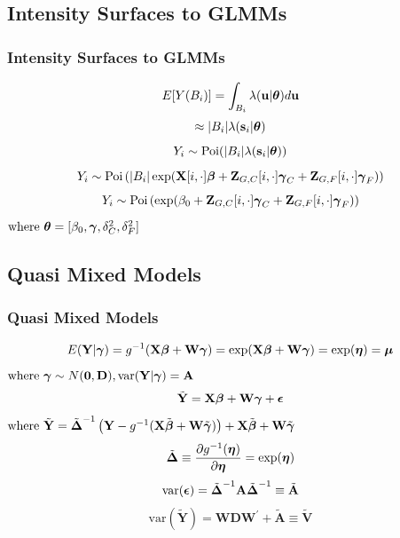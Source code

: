 \documentclass[mathserif,compress]{beamer}
\def\bdm{\begin{displaymath}}
\def\edm{\end{displaymath}}
\def\bs{\mathbf{s}}
\def\bu{\mathbf{u}}
\def\bA{\mathbf{A}}
\def\bD{\mathbf{D}}
\def\bV{\mathbf{V}}
\def\bW{\mathbf{W}}
\def\bX{\mathbf{X}}
\def\bY{\mathbf{Y}}
\def\bZ{\mathbf{Z}}
\def\bbeta{\mbox{\boldmath $\beta$}}
\def\bepsilon{\mbox{\boldmath $\epsilon$}}
\def\bgamma{\mbox{\boldmath $\gamma$}}
\def\bldeta{\mbox{\boldmath $\eta$}}
\def\bmu{\mbox{\boldmath $\mu$}}
\def\btheta{\mbox{\boldmath $\theta$}}
\def\bDelta{\mbox{\boldmath $\Delta$}}
\def\var{\textrm{var}}
\def\bzero{\mathbf{0}}
\def\Poi{\textrm{Poi}}
\begin{document}

\subsection{Intensity Surfaces to GLMMs}
\begin{frame}
\frametitle{Intensity Surfaces to GLMMs}

	\bdm
		E[Y(B_i)] = \int_{B_i} \lambda(\bu|\btheta) d\bu
	\edm \pause
	\bdm
		\approx |B_i| \lambda(\bs_i|\btheta)
	\edm \pause
	\bdm
		Y_i \sim \Poi(|B_i| \lambda(\bs_i|\btheta))
	\edm \pause
	\bdm
		Y_i \sim \Poi\left( |B_i| \exp(\bX[i,\cdot]\bbeta + 
			\bZ_{G,C}[i,\cdot]\bgamma_C + \bZ_{G,F}[i,\cdot]\bgamma_F)\right)
	\edm \pause
	\bdm
		Y_i \sim \Poi\left(\exp(\beta_0 + 
			\bZ_{G,C}[i,\cdot]\bgamma_C + \bZ_{G,F}[i,\cdot]\bgamma_F)\right)
	\edm
	$\textrm{where } \btheta = [\beta_0, \bgamma, \delta_C^2, \delta_F^2]$

\end{frame}


\subsection{Quasi Mixed Models}
\begin{frame}
\frametitle{Quasi Mixed Models}
	\vspace{-.5cm}
	\bdm
		E(\bY|\bgamma) = g^{-1}(\bX\bbeta + \bW\bgamma) = 
		\exp(\bX\bbeta + \bW\bgamma) = \exp(\bldeta) = \bmu
	\edm 
	$\textrm{where } \bgamma \sim N(\bzero, \bD), 
		\var(\bY|\mbox{\boldmath $\gamma$}) = \bA$ \pause
	\bdm
		\tilde{\bY} = \bX\bbeta + \bW\bgamma + \bepsilon
	\edm \pause
	$\textrm{where }\tilde{\bY} = \tilde{\bDelta}^{-1}\left(\bY - 
	  g^{-1}(\bX\tilde{\bbeta} + \bW\tilde{\bgamma})\right) + 
	  \bX\tilde{\bbeta} + \bW\tilde{\bgamma}$
	\bdm
   \tilde{\bDelta} \equiv  
     \frac{\partial g^{-1}(\bldeta)} 
     {\partial \bldeta} = \exp(\bldeta)
	\edm \pause
	\bdm
   \textrm{var}(\bepsilon) =   
     \tilde{\bDelta}^{-1}\bA\tilde{\bDelta}^{-1} \equiv \tilde{\bA}	
	\edm \pause
	\bdm
		\var(\tilde{\bY}) =  \bW\bD\bW^\prime + 
    \tilde{\bA} \equiv \tilde{\bV}
	\edm

\end{frame}
\end{document}
